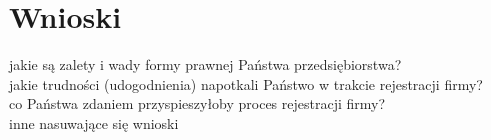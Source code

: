 \section{Wnioski}
jakie są zalety i wady formy prawnej Państwa przedsiębiorstwa?\\
jakie trudności (udogodnienia) napotkali Państwo w trakcie rejestracji firmy?\\
co Państwa zdaniem przyspieszyłoby proces rejestracji firmy?\\
inne nasuwające się wnioski\\